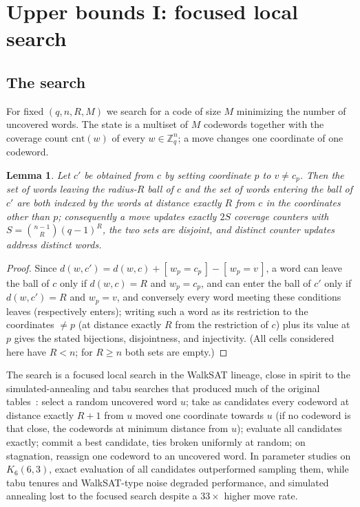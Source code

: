 \documentclass[11pt]{amsart}
\newtheorem{lemma}[theorem]{Lemma}
\newcommand{\Kq}[3]{K_{#1}(#2,#3)}
\newcommand{\Zq}{\mathbb{Z}_q}
\begin{document}
\section{Upper bounds I: focused local search}\label{sec:method}

\subsection{The search}\label{sec:search}

For fixed $(q,n,R,M)$ we search for a code of size $M$ minimizing the
number of uncovered words. The state is a multiset of $M$ codewords
together with the coverage count $\mathrm{cnt}(w)$ of every $w\in\Zq^n$; a
move changes one coordinate of one codeword.

\begin{lemma}\label{lem:move}
Let $c'$ be obtained from $c$ by setting coordinate $p$ to $v\ne c_p$. Then
the set of words leaving the radius-$R$ ball of $c$ and the set of words
entering the ball of $c'$ are both indexed by the words at distance exactly
$R$ from $c$ in the coordinates other than $p$; consequently a move updates
exactly $2S$ coverage counters with $S=\binom{n-1}{R}(q-1)^R$, the two sets
are disjoint, and distinct counter updates address distinct words.
\end{lemma}

\begin{proof}
Since $d(w,c') = d(w,c) + [\,w_p=c_p\,] - [\,w_p=v\,]$, a word can leave
the ball of $c$ only if $d(w,c)=R$ and $w_p=c_p$, and can enter the ball of
$c'$ only if $d(w,c')=R$ and $w_p=v$, and conversely every word meeting
these conditions leaves (respectively enters); writing such a word as its
restriction to the coordinates $\ne p$ (at distance exactly $R$ from the
restriction of $c$) plus its value at $p$ gives the stated bijections,
disjointness, and injectivity. (All cells considered here have $R<n$;
for $R\ge n$ both sets are empty.)
\end{proof}

The search is a focused local search in the WalkSAT lineage, close in
spirit to the simulated-annealing and tabu searches that produced much of
the original tables~\cite{vanLaarhoven,Ostergard}: select a random
uncovered word $u$;
take as candidates every codeword at distance exactly $R+1$ from $u$ moved
one coordinate towards $u$ (if no codeword is that close, the codewords at
minimum distance from $u$); evaluate all candidates exactly; commit a best
candidate, ties broken uniformly at random; on stagnation, reassign one
codeword to an uncovered word. In parameter studies on $\Kq{6}{6}{3}$,
exact evaluation of all candidates outperformed sampling them, while tabu
tenures and WalkSAT-type noise degraded performance, and simulated
annealing lost to the focused search despite a $33\times$ higher move rate.
\end{document}
